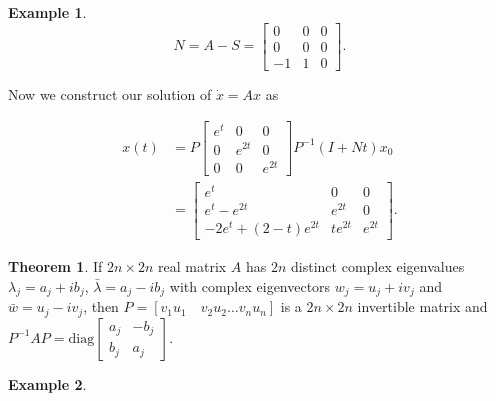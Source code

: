 \documentclass[12pt]{article}
\theoremstyle{definition}
\newtheorem*{example}{Example}
\newtheorem{theorem}{Theorem}[section]  %
\begin{document}
\begin{example}
\[
N = A - S =
\begin{bmatrix}
0 & 0 & 0 \\
0 & 0 & 0 \\
-1 & 1 & 0
\end{bmatrix}.
\]

Now we construct our solution of $\dot x = A x$ as

\[
\begin{split}
x(t) &= P
\begin{bmatrix}
e^t & 0 & 0 \\
0 & e^{2t} & 0 \\
0 & 0 & e^{2t}
\end{bmatrix}
P^{-1} (I + Nt) x_0 \\
&=
\begin{bmatrix}
e^{t} & 0 & 0 \\
e^t - e^{2t} & e^{2t} & 0 \\
-2e^t + (2 - t)e^{2t} & te^{2t} & e^{2t}
\end{bmatrix}.
\end{split}
\]
\end{example}

\begin{theorem}
If $2n \times 2n$ real matrix $A$ has $2n$ distinct complex eigenvalues $\lambda_j = a_j + ib_j$,
$\bar \lambda = a_j - ib_j$ with complex eigenvectors $w_j = u_j + iv_j$ and $\bar w = u_j - iv_j$,
then $P = [v_1 u_1 \quad v_2 u_2 \ldots v_n u_n]$ is a $2n \times 2n$ invertible matrix and
$P^{-1}AP = \text{diag}
\begin{bmatrix}
a_j & -b_j \\
b_j & a_j
\end{bmatrix}$.
\end{theorem}

\begin{example}

\end{example}
\end{document}
